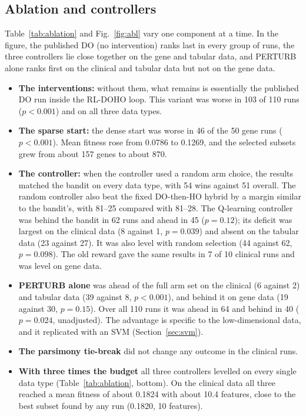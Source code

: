 \documentclass[pdflatex,sn-basic]{sn-jnl}
\begin{document}
\subsection{Ablation and controllers}\label{sec:ablation}
Table~\ref{tab:ablation} and Fig.~\ref{fig:abl} vary one component at a time. In the figure, the published DO (no intervention) ranks last in every group of runs, the three controllers lie close together on the gene and tabular data, and PERTURB alone ranks first on the clinical and tabular data but not on the gene data.
\begin{itemize}
\item \textbf{The interventions:} without them, what remains is essentially the published DO run inside the RL-DOHO loop. This variant was worse in 103 of 110 runs ($p<0.001$) and on all three data types.
\item \textbf{The sparse start:} the dense start was worse in 46 of the 50 gene runs ($p<0.001$). Mean fitness rose from 0.0786 to 0.1269, and the selected subsets grew from about 157 genes to about 870.
\item \textbf{The controller:} when the controller used a random arm choice, the results matched the bandit on every data type, with 54 wins against 51 overall. The random controller also beat the fixed DO-then-HO hybrid by a margin similar to the bandit's, with 81--25 compared with 81--28. The Q-learning controller was behind the bandit in 62 runs and ahead in 45 ($p=0.12$); its deficit was largest on the clinical data (8 against 1, $p=0.039$) and absent on the tabular data (23 against 27). It was also level with random selection (44 against 62, $p=0.098$). The old reward gave the same results in 7 of 10 clinical runs and was level on gene data.
\item \textbf{PERTURB alone} was ahead of the full arm set on the clinical (6 against 2) and tabular data (39 against 8, $p<0.001$), and behind it on gene data (19 against 30, $p=0.15$). Over all 110 runs it was ahead in 64 and behind in 40 ($p=0.024$, unadjusted). The advantage is specific to the low-dimensional data, and it replicated with an SVM (Section~\ref{sec:svm}).
\item \textbf{The parsimony tie-break} did not change any outcome in the clinical runs.
\item \textbf{With three times the budget} all three controllers levelled on every single data type (Table~\ref{tab:ablation}, bottom). On the clinical data all three reached a mean fitness of about 0.1824 with about 10.4 features, close to the best subset found by any run (0.1820, 10 features).
\end{itemize}
\end{document}
